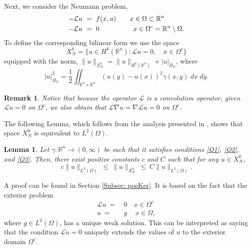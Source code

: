 \documentclass[11pt]{amsart}   	%
\theoremstyle{plain}
\numberwithin{equation}{section}
\newtheorem{lemma}[thm]{Lemma}
\newtheorem{remark}[thm]{Remark}
\def\R{\mathbb{R}}
\begin{document}
Next, we consider the Neumann problem,
\begin{equation}\label{e:nonlocal_N}
\begin{split}
-\mathcal{L} u \ & = \ f(x,u) \qquad  x \in  \Omega \subset \mathbb{R}^n\\
-\mathcal{L}u \ & = \ 0 \hspace{1.75cm} x \in \Omega^c = \R^n \setminus \Omega.
\end{split}
\end{equation}
To define the corresponding bilinear form we use the space
\[ X^k_N = \{ u \in H^k(\R^n) : \mathcal{L}u = 0, \quad  x \in \Omega^c\}\]
equipped with the norm,
$\|u\|_{X^k_N} = \| u\|_{H^k(\R^n)} + |u|_{B_N}$, where
\[|u|^2_{B_N}  = \frac{1}{2} \iint_{\R^n \times \R^n} (u(y) -u(x))^2 \gamma(x,y) \;dx\;dy.\]
\begin{remark}\label{r:propertyX_N}
Notice that because the operator $\mathcal{L}$ is a convolution operator, given $\mathcal{L}u =0$ on $\Omega^c$, we also obtain that $\mathcal{L} \nabla u =  \nabla \mathcal{L}u =  0$ on $\Omega^c$. 
\end{remark}



The following Lemma, which follows from the analysis presented in \cite{olena2021}, shows that space $X^0_N$ is equivalent to $L^2(\Omega)$. 

\begin{lemma}\label{l:equivalent_norms}
Let $\gamma: \R^n \longrightarrow (0,\infty)$ be such that it satisfies conditions \ref{Q1}, \ref{Q2}, and \ref{Q3}.
Then, there exist positive constants $c$ and $C$ such that for any $u \in X^0_N$,
\[ c\|u\|_{L^2(\Omega)} \ \leq \ \| u\|_{X^0_N} \ \leq \ C\|u\|_{L^2(\Omega)}.\]
\end{lemma}

A proof can be found in Section \ref{Subsec: posKer}. It is based on the fact that the exterior problem
\begin{equation}\label{e:exterior_problem}
\begin{split}
\mathcal{L}u \ =& \ 0 \quad x \in \Omega^c\\
u \ = & \ g \ \quad x \in \Omega,
\end{split}
\end{equation}
where $g \in L^2(\Omega)$, has a unique weak solution. This can be interpreted as saying that the condition $\mathcal{L} u=0$ uniquely extends the values of $u$ to the exterior domain $\Omega^c$.
\end{document}
